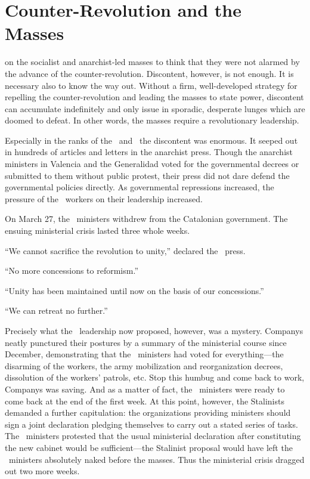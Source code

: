 \chapter{Counter-Revolution and the Masses}

 on the socialist and anarchist-led masses to think that they were not alarmed by the advance of the counter-revolution. Discontent, however, is not enough. It is necessary also to know the way out. Without a firm, well-developed strategy for repelling the counter-revolution and leading the masses to state power, discontent can accumulate indefinitely and only issue in sporadic, desperate lunges which are doomed to defeat. In other words, the masses require a revolutionary leadership.

Especially in the ranks of the \CNT\ and \FAI\ the discontent was enormous. It seeped out in hundreds of articles and letters in the anarchist press. Though the anarchist ministers in Valencia and the Generalidad voted for the governmental decrees or submitted to them without public protest, their press did not dare defend the governmental policies directly. As governmental repressions increased, the pressure of the \CNT\ workers on their leadership increased.

On March 27, the \CNT\ ministers withdrew from the Catalonian government. The ensuing ministerial crisis lasted three whole weeks.

``We cannot sacrifice the revolution to unity,'' declared the \CNT\ press.

``No more concessions to reformism.''

``Unity has been maintained until now on the basis of our concessions.''

``We can retreat no further.''

Precisely what the \CNT\ leadership now proposed, however, was a mystery. Companys neatly punctured their postures by a summary of the ministerial course since December, demonstrating that the \CNT\ ministers had voted for everything---the disarming of the workers, the army mobilization and reorganization decrees, dissolution of the workers’ patrols, etc. Stop this humbug and come back to work, Companys was saving. And as a matter of fact, the \CNT\ ministers were ready to come back at the end of the first week. At this point, however, the Stalinists demanded a further capitulation: the organizations providing ministers should sign a joint declaration pledging themselves to carry out a stated series of tasks. The \CNT\ ministers protested that the usual ministerial declaration after constituting the new cabinet would be sufficient---the Stalinist proposal would have left the \CNT\ ministers absolutely naked before the masses. Thus the ministerial crisis dragged out two more weeks.

